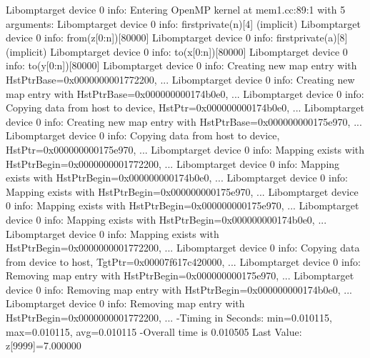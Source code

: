\documentclass[
]{article}
\newenvironment{Shaded}{}{}
\newcommand{\ExtensionTok}[1]{#1}
\newcommand{\NormalTok}[1]{#1}
\begin{document}
\begin{Shaded}
\begin{Highlighting}[]
\ExtensionTok{Libomptarget}\NormalTok{ device 0 info: Entering OpenMP kernel at mem1.cc:89:1 with 5 arguments:}
\ExtensionTok{Libomptarget}\NormalTok{ device 0 info: firstprivate(n)[}\ExtensionTok{4}\NormalTok{] (implicit)}
\ExtensionTok{Libomptarget}\NormalTok{ device 0 info: from(z[0:n])[}\ExtensionTok{80000}\NormalTok{]}
\ExtensionTok{Libomptarget}\NormalTok{ device 0 info: firstprivate(a)[}\ExtensionTok{8}\NormalTok{] (implicit)}
\ExtensionTok{Libomptarget}\NormalTok{ device 0 info: to(x[0:n])[}\ExtensionTok{80000}\NormalTok{]}
\ExtensionTok{Libomptarget}\NormalTok{ device 0 info: to(y[0:n])[}\ExtensionTok{80000}\NormalTok{]}
\ExtensionTok{Libomptarget}\NormalTok{ device 0 info: Creating new map entry with HstPtrBase=0x0000000001772200, ... }
\ExtensionTok{Libomptarget}\NormalTok{ device 0 info: Creating new map entry with HstPtrBase=0x000000000174b0e0, ... }
\ExtensionTok{Libomptarget}\NormalTok{ device 0 info: Copying data from host to device, HstPtr=0x000000000174b0e0, ...}
\ExtensionTok{Libomptarget}\NormalTok{ device 0 info: Creating new map entry with HstPtrBase=0x000000000175e970, ...}
\ExtensionTok{Libomptarget}\NormalTok{ device 0 info: Copying data from host to device, HstPtr=0x000000000175e970, ...}
\ExtensionTok{Libomptarget}\NormalTok{ device 0 info: Mapping exists with HstPtrBegin=0x0000000001772200, ...}
\ExtensionTok{Libomptarget}\NormalTok{ device 0 info: Mapping exists with HstPtrBegin=0x000000000174b0e0, ...}
\ExtensionTok{Libomptarget}\NormalTok{ device 0 info: Mapping exists with HstPtrBegin=0x000000000175e970, ...}
\ExtensionTok{Libomptarget}\NormalTok{ device 0 info: Mapping exists with HstPtrBegin=0x000000000175e970, ...}
\ExtensionTok{Libomptarget}\NormalTok{ device 0 info: Mapping exists with HstPtrBegin=0x000000000174b0e0, ...}
\ExtensionTok{Libomptarget}\NormalTok{ device 0 info: Mapping exists with HstPtrBegin=0x0000000001772200, ...}
\ExtensionTok{Libomptarget}\NormalTok{ device 0 info: Copying data from device to host, TgtPtr=0x00007f617c420000, ...}
\ExtensionTok{Libomptarget}\NormalTok{ device 0 info: Removing map entry with HstPtrBegin=0x000000000175e970, ...}
\ExtensionTok{Libomptarget}\NormalTok{ device 0 info: Removing map entry with HstPtrBegin=0x000000000174b0e0, ...}
\ExtensionTok{Libomptarget}\NormalTok{ device 0 info: Removing map entry with HstPtrBegin=0x0000000001772200, ...}
\ExtensionTok{{-}Timing}\NormalTok{ in Seconds: min=0.010115, max=0.010115, avg=0.010115}
\ExtensionTok{{-}Overall}\NormalTok{ time is 0.010505}
\ExtensionTok{Last}\NormalTok{ Value: z[9999]=7.000000}
\end{Highlighting}
\end{Shaded}
\end{document}
